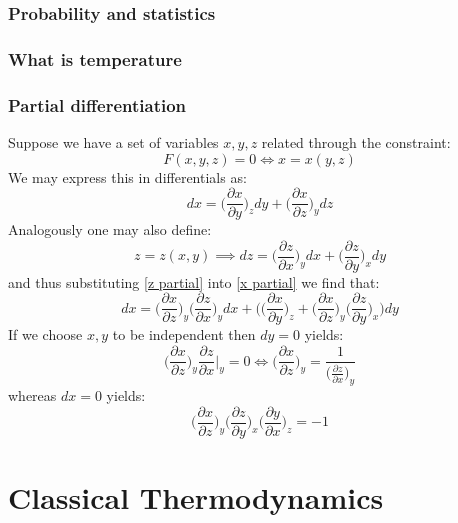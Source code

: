 \documentclass[a4paper,11pt,oneside]{book}
\begin{document}
\section{Probability and statistics}
 
\section{What is temperature}
\section{Partial differentiation}
Suppose we have a set of variables $x,y,z$ related through the constraint:
\begin{equation}
    F(x,y,z) = 0 \iff x=x(y,z)
\end{equation}
We may express this in differentials as:
\begin{equation}\label{x partial}
    dx = \bigg(\frac{\partial x}{\partial y} \bigg)_z dy + \bigg(\frac{\partial x}{\partial z}\bigg)_y dz
\end{equation}
Analogously one may also define:
\begin{equation}\label{z partial}
    z=z(x,y) \implies  dz = \bigg(\frac{\partial z}{\partial x} \bigg)_y dx + \bigg(\frac{\partial z}{\partial y}\bigg)_x dy
\end{equation}
and thus substituting \eqref{z partial} into \eqref{x partial} we find that:
\begin{equation}
    dx = \bigg(\frac{\partial x}{\partial z}\bigg)_y \bigg(\frac{\partial z}{\partial x}\bigg)_y dx + \bigg(\bigg(\frac{\partial x}{\partial y}\bigg)_z + \bigg(\frac{\partial x}{\partial z}\bigg)_y \bigg(\frac{\partial z}{\partial y}\bigg)_x\bigg)dy
\end{equation}
If we choose $x,y$ to be independent then $dy = 0$ yields:
\begin{equation}
    \boxed{\bigg(\frac{\partial x}{\partial z}\bigg)_y \frac{\partial z}{\partial x}\bigg|_y=0 \iff \bigg(\frac{\partial x}{\partial z}\bigg)_y=\frac{1}{\big(\frac{\partial z}{\partial x}\big)_y}}
\end{equation}
whereas $dx=0$ yields:
\begin{equation}
 \boxed{\bigg(\frac{\partial x}{\partial z}\bigg)_y \bigg(\frac{\partial z}{\partial y}\bigg)_x \bigg(\frac{\partial y}{\partial x}\bigg)_z=-1}
\end{equation}

\part{Classical Thermodynamics}
\end{document}
